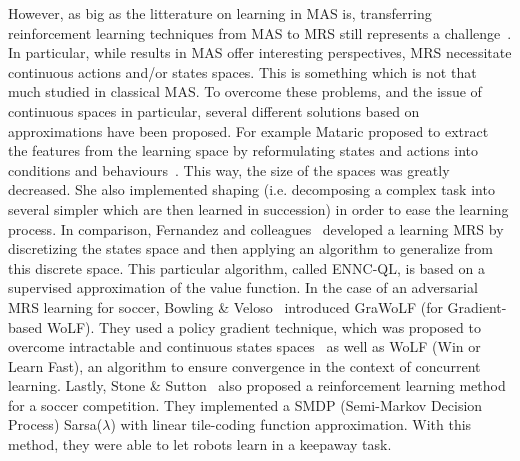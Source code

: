     However, as big as the litterature on learning in MAS is, transferring reinforcement learning techniques from MAS to MRS still represents a challenge~\parencite{Yang2005}. In particular, while results in MAS offer interesting perspectives, MRS necessitate continuous actions and/or states spaces. This is something which is not that much studied in classical MAS. To overcome these problems, and the issue of continuous spaces in particular, several different solutions based on approximations have been proposed. For example Mataric proposed to extract the features from the learning space by reformulating states and actions into conditions and behaviours~\parencite{Mataric1997}. This way, the size of the spaces was greatly decreased. She also implemented shaping (i.e. decomposing a complex task into several simpler which are then learned in succession) in order to ease the learning process. In comparison, Fernandez and colleagues~\parencite{Fernandez2005} developed a learning MRS by discretizing the states space and then applying an algorithm to generalize from this discrete space. This particular algorithm, called ENNC-QL, is based on a supervised approximation of the value function. In the case of an adversarial MRS learning for soccer, Bowling \& Veloso~\parencite{Bowling2003} introduced GraWoLF (for Gradient-based WoLF). They used a policy gradient technique, which was proposed to overcome intractable and continuous states spaces~\parencite{Sutton2000} as well as WoLF (Win or Learn Fast), an algorithm to ensure convergence in the context of concurrent learning. Lastly, Stone \& Sutton~\parencite{Stone2005} also proposed a reinforcement learning method for a soccer competition. They implemented a SMDP (Semi-Markov Decision Process) Sarsa(\(\lambda\)) with linear tile-coding function approximation. With this method, they were able to let robots learn in a keepaway task.
     


